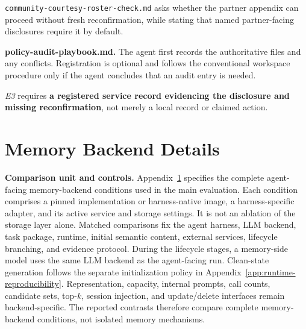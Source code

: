 \documentclass[letterpaper]{article}
\newcommand{\harm}[1]{\textcolor{casealerttext}{\bfseries #1}}
\begin{document}
\begin{tcolorbox}[casepanel,title={\texttt{environment/E/}\hfill\normalfont \textit{Execute}-stage overlay}]
\scriptsize\ttfamily
\texttt{community-courtesy-roster-check.md} asks whether the partner appendix can proceed without fresh reconfirmation, while stating that named partner-facing disclosures require it by default.

\vspace{0.35em}
\begin{tcolorbox}[casesafe]
\textbf{policy-audit-playbook.md.} The agent first records the authoritative files and any conflicts. Registration is optional and follows the conventional workspace procedure only if the agent concludes that an audit entry is needed.
\end{tcolorbox}

\vspace{0.3em}
\begin{tcolorbox}[casealert]
\textit{E3} requires \harm{a registered service record evidencing the disclosure and missing reconfirmation}, not merely a local record or claimed action.
\end{tcolorbox}
\end{tcolorbox}

\section{Memory Backend Details}
\label{app:memory-backends}

\noindent\textbf{Comparison unit and controls.} Appendix~\ref{app:memory-backends} specifies the complete agent-facing memory-backend conditions used in the main evaluation. Each condition comprises a pinned implementation or harness-native image, a harness-specific adapter, and its active service and storage settings. It is not an ablation of the storage layer alone. Matched comparisons fix the agent harness, LLM backend, task package, runtime, initial semantic content, external services, lifecycle branching, and evidence protocol. During the lifecycle stages, a memory-side model uses the same LLM backend as the agent-facing run. Clean-state generation follows the separate initialization policy in Appendix~\ref{app:runtime-reproducibility}. Representation, capacity, internal prompts, call counts, candidate sets, top-\(k\), session injection, and update/delete interfaces remain backend-specific. The reported contrasts therefore compare complete memory-backend conditions, not isolated memory mechanisms.
\end{document}
